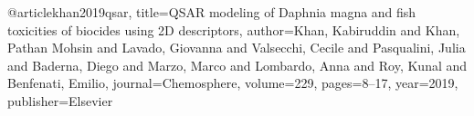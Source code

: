 @article{khan2019qsar,
  title={QSAR modeling of Daphnia magna and fish toxicities of biocides using 2D descriptors},
  author={Khan, Kabiruddin and Khan, Pathan Mohsin and Lavado, Giovanna and Valsecchi, Cecile and Pasqualini, Julia and Baderna, Diego and Marzo, Marco and Lombardo, Anna and Roy, Kunal and Benfenati, Emilio},
  journal={Chemosphere},
  volume={229},
  pages={8--17},
  year={2019},
  publisher={Elsevier}
}